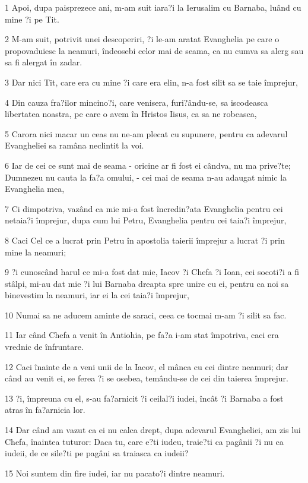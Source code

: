 \par 1 Apoi, dupa paisprezece ani, m-am suit iara?i la Ierusalim cu Barnaba, luând cu mine ?i pe Tit.
\par 2 M-am suit, potrivit unei descoperiri, ?i le-am aratat Evanghelia pe care o propovaduiesc la neamuri, îndeosebi celor mai de seama, ca nu cumva sa alerg sau sa fi alergat în zadar.
\par 3 Dar nici Tit, care era cu mine ?i care era elin, n-a fost silit sa se taie împrejur,
\par 4 Din cauza fra?ilor mincino?i, care venisera, furi?ându-se, sa iscodeasca libertatea noastra, pe care o avem în Hristos Iisus, ca sa ne robeasca,
\par 5 Carora nici macar un ceas nu ne-am plecat cu supunere, pentru ca adevarul Evangheliei sa ramâna neclintit la voi.
\par 6 Iar de cei ce sunt mai de seama - oricine ar fi fost ei cândva, nu ma prive?te; Dumnezeu nu cauta la fa?a omului, - cei mai de seama n-au adaugat nimic la Evanghelia mea,
\par 7 Ci dimpotriva, vazând ca mie mi-a fost încredin?ata Evanghelia pentru cei netaia?i împrejur, dupa cum lui Petru, Evanghelia pentru cei taia?i împrejur,
\par 8 Caci Cel ce a lucrat prin Petru în apostolia taierii împrejur a lucrat ?i prin mine la neamuri;
\par 9 ?i cunoscând harul ce mi-a fost dat mie, Iacov ?i Chefa ?i Ioan, cei socoti?i a fi stâlpi, mi-au dat mie ?i lui Barnaba dreapta spre unire cu ei, pentru ca noi sa binevestim la neamuri, iar ei la cei taia?i împrejur,
\par 10 Numai sa ne aducem aminte de saraci, ceea ce tocmai m-am ?i silit sa fac.
\par 11 Iar când Chefa a venit în Antiohia, pe fa?a i-am stat împotriva, caci era vrednic de înfruntare.
\par 12 Caci înainte de a veni unii de la Iacov, el mânca cu cei dintre neamuri; dar când au venit ei, se ferea ?i se osebea, temându-se de cei din taierea împrejur.
\par 13 ?i, împreuna cu el, s-au fa?arnicit ?i ceilal?i iudei, încât ?i Barnaba a fost atras în fa?arnicia lor.
\par 14 Dar când am vazut ca ei nu calca drept, dupa adevarul Evangheliei, am zis lui Chefa, înaintea tuturor: Daca tu, care e?ti iudeu, traie?ti ca pagânii ?i nu ca iudeii, de ce sile?ti pe pagâni sa traiasca ca iudeii?
\par 15 Noi suntem din fire iudei, iar nu pacato?i dintre neamuri.
